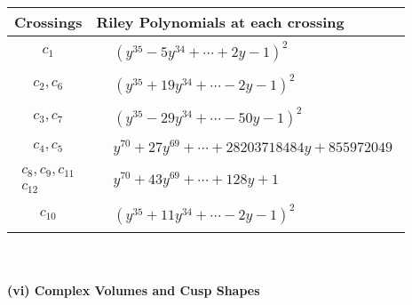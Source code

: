 \documentclass[1p]{elsarticle_modified}
\theoremstyle{definition}
\begin{document}
\begin{tabular}{m{50pt}|m{274pt}}
Crossings & \hspace{64pt}Riley Polynomials at each crossing \\
\hline $$\begin{aligned}c_{1}\end{aligned}$$&$\begin{aligned}
&(y^{35}-5 y^{34}+\cdots+2 y-1)^{2}
\end{aligned}$\\
\hline $$\begin{aligned}c_{2},c_{6}\end{aligned}$$&$\begin{aligned}
&(y^{35}+19 y^{34}+\cdots-2 y-1)^{2}
\end{aligned}$\\
\hline $$\begin{aligned}c_{3},c_{7}\end{aligned}$$&$\begin{aligned}
&(y^{35}-29 y^{34}+\cdots-50 y-1)^{2}
\end{aligned}$\\
\hline $$\begin{aligned}c_{4},c_{5}\end{aligned}$$&$\begin{aligned}
&y^{70}+27 y^{69}+\cdots+28203718484 y+855972049
\end{aligned}$\\
\hline $$\begin{aligned}c_{8},c_{9},c_{11}\\c_{12}\end{aligned}$$&$\begin{aligned}
&y^{70}+43 y^{69}+\cdots+128 y+1
\end{aligned}$\\
\hline $$\begin{aligned}c_{10}\end{aligned}$$&$\begin{aligned}
&(y^{35}+11 y^{34}+\cdots-2 y-1)^{2}
\end{aligned}$\\
\hline
\end{tabular}\\~\\
\newpage\flushleft \textbf{(vi) Complex Volumes and Cusp Shapes}
\end{document}
